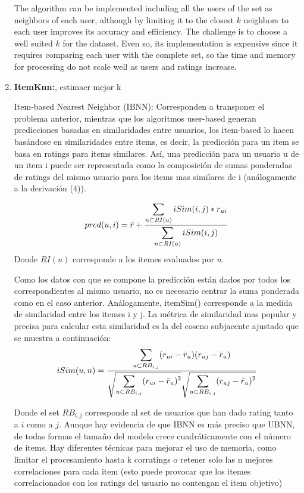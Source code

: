 \documentclass[letterpaper, 10 pt, conference]{ieeeconf}  %
\begin{document}
\begin{enumerate}
    The algorithm can be implemented including all the users of the set as neighbors of each user, although by limiting it to the closest $k$ neighbors to each user improves its accuracy and efficiency. The challenge is to choose a well suited $k$ for the dataset. Even so, its implementation is expensive since it requires comparing each user with the complete set, so the time and memory for processing do not scale well as users and ratings increase. 
    
    
    \item \textbf{ItemKnn:}, estimaer mejor k
    
    Item-based Nearest Neighbor (IBNN): Corresponden a transponer el problema anterior, mientras que los algoritmos user-based generan predicciones basadas en similaridades entre usuarios, los item-based lo hacen basándose en similaridades entre items, es decir, la predicción para un item se basa en ratings para items similares. Así, una predicción para un usuario u de un item i puede ser representada como la composición de sumas ponderadas de ratings del mismo usuario para los items mas similares de i (análogamente a la derivación (4)).
    
    \begin{equation}
        pred(u,i)=\Bar{r}+ \frac{\displaystyle \sum_{n \subset RI(u)}iSim(i,j)*r_{ui}}{\displaystyle \sum_{n \subset RI(u)}iSim(i,j)}
    \end{equation}
    Donde $RI(u)$ corresponde a los itemes evaluados por $u$.
    
    Como los datos con que se compone la predicción están dados por todos los correspondientes al mismo usuario, no es necesario centrar la suma ponderada como en el caso anterior. Análogamente, itemSim() corresponde a la medida de similaridad entre los itemes i y j. La métrica de similaridad mas popular y precisa para calcular esta similaridad es la del coseno subjacente ajustado que se muestra a continuación: 
     \begin{equation}
        iSim(u,n)=\frac{\displaystyle \sum_{u \subset RB_{i,j}}(r_{ui}-\Bar{r}_{u})(r_{uj}-\Bar{r}_{u})}{ \sqrt{\displaystyle \sum_{u \subset RB_{i,j}}(r_{ui}-\Bar{r}_{u})^2}  \sqrt{\displaystyle \sum_{u \subset RB_{i,j}}(r_{uj}-\Bar{r}_{u})^2} }
    \end{equation}
    
    Donde el set $RB_{i,j}$ corresponde al set de usuarios que han dado rating tanto a $i$ como a $j$. Aunque hay evidencia de que IBNN es más preciso que UBNN, de todas formas el tamaño del modelo crece cuadráticamente con el número de items. Hay diferentes técnicas para mejorar el uso de memoria, como limitar el procesamiento hasta k corratings o retener solo las n mejores correlaciones para cada item (esto puede provocar que los itemes correlacionados con los ratings del usuario no contengan el item objetivo)
    

\end{enumerate}
\end{document}
